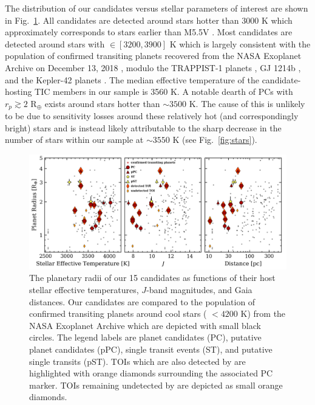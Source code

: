 The distribution of our candidates versus stellar parameters of interest are shown in
Fig.~\ref{fig:planetstar}. All candidates are detected around stars hotter than 3000 K which
approximately corresponds to stars earlier than M5.5V \citep{pecaut13}. Most candidates
are detected around stars with \teff{} $\in [3200,3900]$ K which is largely consistent with the
population of confirmed transiting planets recovered from the NASA Exoplanet Archive on
December 13, 2018 \citep{akeson13}, modulo the TRAPPIST-1 planets \citep{gillon17}, GJ 1214b
\citep{charbonneau09}, and the Kepler-42 planets \citep{muirhead12b}. The median effective
temperature of the candidate-hosting TIC members in our sample is 3560 K. A notable dearth of PCs
with $r_p \gtrsim 2$ R$_{\oplus}$ exists around stars hotter than $\sim 3500$ K. The cause of
this is unlikely to be due to sensitivity losses around these relatively hot (and correspondingly
bright) stars and is instead likely attributable to the sharp decrease in the number of stars
within our sample at \teff{} $\sim 3550$ K (see Fig.~\ref{fig:stars}). \\

\begin{figure}
  \centering
  \includegraphics[width=0.9\hsize]{figures/planetsample_star.png}
  \caption[Stellar parameters for the \texttt{ORION} planet candidate sample host stars.]
          {The planetary radii of our 15 \pipeline{} candidates as functions of their host stellar
    effective temperatures, $J$-band magnitudes, and Gaia distances. Our candidates
    are compared to the population of confirmed transiting planets around cool stars (\teff{} $<4200$
    K) from the NASA Exoplanet Archive which are depicted with small black circles.
    The legend labels are planet candidates (PC), 
    putative planet candidates (pPC), 
    single transit events (ST), and  putative single transits (pST).
    TOIs which are also detected by \pipeline{} are highlighted with
    orange diamonds surrounding the associated PC marker. TOIs remaining undetected by \pipeline{}
    are depicted as small orange diamonds.}
  \label{fig:planetstar}
\end{figure}

